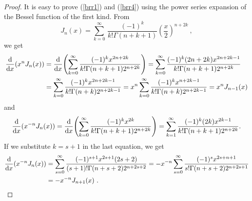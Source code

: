 \begin{proof}
It is easy to prove (\ref{brr1}) and (\ref{brr4}) using the power
series expansion of the Bessel function of the first kind.  From
\[
J_n(x) = \sum_{k=0}^{\infty} \, \frac{(-1)^k}{k! \Gamma(n+k+1)}
\left(\frac{x}{2}\right)^{n+2k} \ ,
\]
we get
\begin{align*}
\dfdx{(x^n J_n(x))}{x} &=
\dfdx{ \left(\sum_{k=0}^{\infty} \frac{(-1)^k x^{2n+2k}}
{k! \Gamma(n+k+1) 2^{n+2k}}\right) }{x}
= \sum_{k=0}^{\infty} \frac{(-1)^k (2n+2k) x^{2n+2k-1}}
{k! \Gamma(n+k+1) 2^{n+2k}} \\
&= \sum_{k=0}^{\infty} \frac{(-1)^k x^{2n+2k-1}}
{k! \Gamma(n+k) 2^{n+2k-1}}
= x^n \sum_{k=0}^{\infty} \frac{(-1)^k x^{n+2k-1}}
{k! \Gamma(n+k) 2^{n+2k-1}} = x^n J_{n-1}(x)
\end{align*}
and
\[
\dfdx{(x^{-n} J_n(x))}{x} =
\dfdx{ \left(\sum_{k=0}^{\infty} \frac{(-1)^k x^{2k}}
{k! \Gamma(n+k+1) 2^{n+2k}}\right) }{x}
= \sum_{k=1}^{\infty} \frac{(-1)^k (2k) x^{2k-1}}
{k! \Gamma(n+k+1) 2^{n+2k}} .
\]
If we substitute $k=s+1$ in the last equation, we get
\begin{align*}
\dfdx{(x^{-n} J_n(x))}{x} 
&= \sum_{s=0}^{\infty} \frac{(-1)^{s+1} x^{2s+1}(2s+2)}
{(s+1)! \Gamma(n+s+2) 2^{n+2s+2}}
= -x^{-n} \sum_{s=0}^{\infty} \frac{(-1)^s x^{2s+n+1}}
{s! \Gamma(n+s+2) 2^{n+2s+1}}\\
& = -x^{-n} J_{n+1}(x) \ . \qedhere
\end{align*}
\end{proof}

